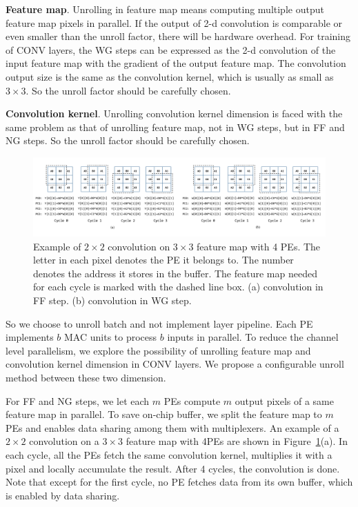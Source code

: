 {\bf{Feature map}}. Unrolling in feature map means computing multiple output feature map pixels in parallel. If the output of 2-d convolution is comparable or even smaller than the unroll factor, there will be hardware overhead. For training of CONV layers, the WG steps can be expressed as the 2-d convolution of the input feature map with the gradient of the output feature map. The convolution output size is the same as the convolution kernel, which is usually as small as $3\times 3$. So the unroll factor should be carefully chosen.

{\bf{Convolution kernel}}. Unrolling convolution kernel dimension is faced with the same problem as that of unrolling feature map, not in WG steps, but in FF and NG steps. So the unroll factor should be carefully chosen.

\begin{figure}[t]
  \centering
  \includegraphics[width=2.0\columnwidth]{figures/mmap.pdf}
  \caption{Example of $2\times 2$ convolution on $3\times 3$ feature map with 4 PEs. The letter in each pixel denotes the PE it belongs to. The number denotes the address it stores in the buffer. The feature map needed for each cycle is marked with the dashed line box. (a) convolution in FF step. (b) convolution in WG step.}
  \label{fig:mmap}
\end{figure}

So we choose to unroll batch and not implement layer pipeline. Each PE implements $b$ MAC units to process $b$ inputs in parallel. To reduce the channel level parallelism, we explore the possibility of unrolling feature map and convolution kernel dimension in CONV layers. We propose a configurable unroll method between these two dimension. 

For FF and NG steps, we let each $m$ PEs compute $m$ output pixels of a same feature map in parallel. To save on-chip buffer, we split the feature map to $m$ PEs and enables data sharing among them with multiplexers. An example of a $2\times 2$ convolution on a $3\times 3$ feature map with 4PEs are shown in Figure~\ref{fig:mmap}(a). In each cycle, all the PEs fetch the same convolution kernel, multiplies it with a pixel and locally accumulate the result. After 4 cycles, the convolution is done. Note that except for the first cycle, no PE fetches data from its own buffer, which is enabled by data sharing.

